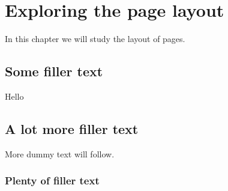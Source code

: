 \documentclass[a4paper, 12pt]{book}
\begin{document}
\chapter{Exploring the page layout}
In this chapter we will study the layout of pages.
\section{Some filler text}
Hello
\section{A lot more filler text}
More dummy text will follow.
\subsection{Plenty of filler text}
\end{document}
